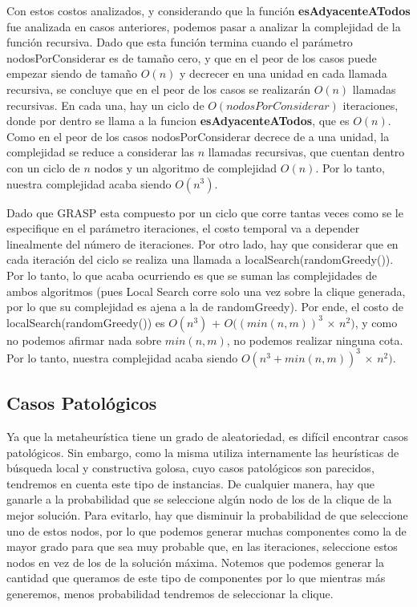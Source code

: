Con estos costos analizados, y considerando que la función \textbf{esAdyacenteATodos} fue analizada en casos anteriores, podemos pasar a analizar la complejidad de la función recursiva. Dado que esta función termina cuando el parámetro nodosPorConsiderar es de tamaño cero, y que en el peor de los casos puede empezar siendo de tamaño $O(n)$ y decrecer en una unidad en cada llamada recursiva, se concluye que en el peor de los casos se realizarán $O(n)$ llamadas recursivas. En cada una, hay un ciclo de $O(nodosPorConsiderar)$ iteraciones, donde por dentro se llama a la funcion \textbf{esAdyacenteATodos}, que es $O(n)$. Como en el peor de los casos nodosPorConsiderar decrece de a una unidad, la complejidad se reduce a considerar las $n$ llamadas recursivas, que cuentan dentro con un ciclo de $n$ nodos y un algoritmo de complejidad $O(n)$. Por lo tanto, nuestra complejidad acaba siendo $O(n^3)$.

Dado que GRASP esta compuesto por un ciclo que corre tantas veces como se le especifique en el parámetro iteraciones, el costo temporal va a depender linealmente del número de iteraciones. Por otro lado, hay que considerar que en cada iteración del ciclo se realiza una llamada a localSearch(randomGreedy()). Por lo tanto, lo que acaba ocurriendo es que se suman las complejidades de ambos algoritmos (pues Local Search corre solo una vez sobre la clique generada, por lo que su complejidad es ajena a la de randomGreedy). Por ende, el costo de localSearch(randomGreedy()) es $O(n^3)$ + $O((min(n,m))^3$ $\times$ $n^2)$, y como no podemos afirmar nada sobre $min(n,m)$, no podemos realizar ninguna cota. Por lo tanto, nuestra complejidad acaba siendo $O(n^3 + min(n,m))^3$ $\times$ $n^2)$.

\subsection{Casos Patológicos}

Ya que la metaheurística tiene un grado de aleatoriedad, es difícil encontrar casos patológicos. Sin embargo, como la misma utiliza internamente las heurísticas de búsqueda local y constructiva golosa, cuyo casos patológicos son parecidos, tendremos en cuenta este tipo de instancias. De cualquier manera, hay que ganarle a la probabilidad que se seleccione algún nodo de los de la clique de la mejor solución. Para evitarlo, hay que disminuir la probabilidad de que seleccione uno de estos nodos, por lo que podemos generar muchas componentes como la de mayor grado para que sea muy probable que, en las iteraciones, seleccione estos nodos en vez de los de la solución máxima. Notemos que podemos generar la cantidad que queramos de este tipo de componentes por lo que mientras más generemos, menos probabilidad tendremos de seleccionar la clique.

